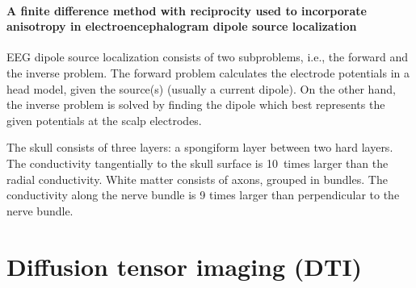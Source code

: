 \paragraph{A finite difference method with reciprocity used to incorporate anisotropy in electroencephalogram dipole source localization~\cite{pmid16077227}}{
EEG dipole source localization consists of two subproblems, i.e., the forward and the inverse problem. The forward problem calculates the electrode potentials in a head model, given the source(s) (usually a current dipole). On the other hand, the inverse problem is solved by finding the dipole which best represents the given potentials at the scalp electrodes. 

The skull consists of three layers: a spongiform layer between two hard layers. The conductivity tangentially to the skull surface is 10~times larger than the radial conductivity. White matter consists of axons, grouped in bundles. The conductivity along the nerve bundle is 9 times larger than perpendicular to the nerve bundle.
}

\section{Diffusion tensor imaging (DTI)}

